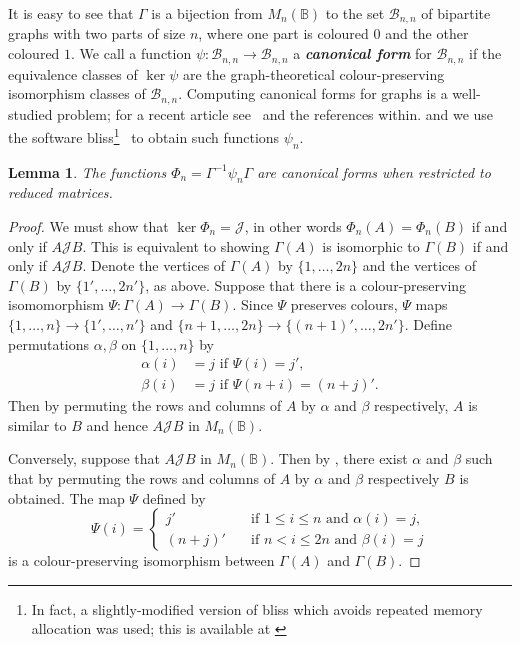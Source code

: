 \documentclass[11pt]{article}
\newtheorem{lemma}[thm]{Lemma}
\newcommand{\defn}[1]{\textbf{\textit{#1}}}
\numberwithin{equation}{section}
\renewcommand{\to}{\longrightarrow}
\newcommand{\B}{\mathbb{B}}
\newcommand{\Bn}{M_n(\B)}
\newcommand{\J}{\mathscr{J}}
\newcommand{\BGSet}{\mathcal{B}_{n,n}}
\begin{document}
It is easy to see that $\Gamma$ is a bijection from $\Bn$ to the set $\BGSet$ of
bipartite graphs with two parts of size $n$, where one part is coloured $0$ and
the other coloured $1$. We call a function $\psi: \BGSet \to \BGSet$ a
\defn{canonical form} for $\BGSet$ if the equivalence classes of $\ker\psi$ are
the graph-theoretical colour-preserving isomorphism classes of $\BGSet$.
Computing canonical forms for graphs is a well-studied problem; for a recent
article see~\cite{McKay2013aa} and the references within. 
and we use the software bliss\footnote{In fact, a slightly-modified version of
  bliss which avoids repeated memory allocation was used; this is available at
  \cite{https://github.com/james-d-mitchell/bliss}}~\cite{Junttila2007aa, Bliss} to obtain such functions $\psi_n$. 
\begin{lemma}
  The functions $\Phi_n = \Gamma^{-1}\psi_n\Gamma$ are canonical forms when
  restricted to reduced matrices. 
\end{lemma}
\begin{proof}
  We must show that $\ker\Phi_n = \J$, in other words $\Phi_n(A) = \Phi_n(B)$ if and
  only if $A\J B$. This is equivalent to showing $\Gamma(A)$ is isomorphic to
  $\Gamma(B)$ if and only if $A \J B$. Denote the vertices of $\Gamma(A)$ by
  $\{1, \ldots, 2 n\}$ and the vertices of $\Gamma(B)$ by $\{1', \ldots, 2n'\}$,
  as above.
  Suppose that there is a colour-preserving isomomorphism $\Psi: \Gamma(A) \to
  \Gamma(B)$. Since $\Psi$ preserves colours, $\Psi$ maps $\{1, \ldots, n\} \to
  \{1', \ldots, n'\}$ and $\{n + 1, \ldots, 2n\} \to \{(n + 1)', \ldots, 2n'\}$.
  Define permutations $\alpha, \beta$ on $\{1,\ldots, n\}$ by 
  \begin{align*}
    \alpha(i) &= j \text{ if } \Psi(i) = j',\\
    \beta(i)  &= j \text{ if } \Psi(n + i) = (n + j)'.
  \end{align*}
  Then by permuting the rows and columns of $A$ by $\alpha$ and $\beta$
  respectively, $A$ is similar to $B$ and hence $A \J B$ in $\Bn$.

  Conversely, suppose that $A \J B$ in $\Bn$. Then by
  , there exist $\alpha$ and $\beta$ such
  that by permuting the rows and columns of $A$ by $\alpha$ and $\beta$
  respectively $B$ is obtained. The map $\Psi$ defined by
  \[\Psi(i) = \begin{cases}
      j' \quad &\text{if } 1 \leq i \leq n \text{ and }\alpha(i) = j, \\
      (n + j)' \quad &\text{if } n < i \leq 2n \text{ and }\beta(i) = j
    \end{cases}
  \]
  is a colour-preserving isomorphism between $\Gamma(A)$ and $\Gamma(B)$.
\end{proof}
\end{document}
